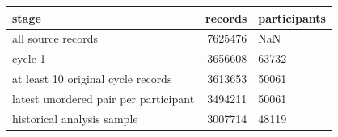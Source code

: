 \begin{tabular}{lrl}
\toprule
stage & records & participants \\
\midrule
all source records & 7625476 & NaN \\
cycle 1 & 3656608 & 63732 \\
at least 10 original cycle records & 3613653 & 50061 \\
latest unordered pair per participant & 3494211 & 50061 \\
historical analysis sample & 3007714 & 48119 \\
\bottomrule
\end{tabular}
